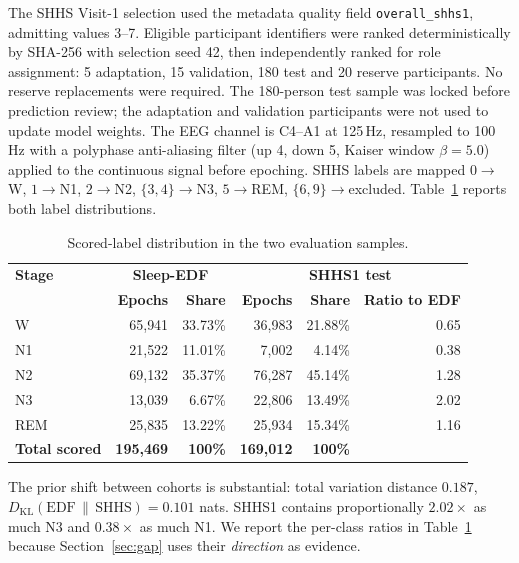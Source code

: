 \documentclass[11pt,a4paper]{article}
\begin{document}
The SHHS Visit-1 selection used the metadata quality field \texttt{overall\_shhs1}, admitting values
3--7. Eligible participant identifiers were ranked deterministically by SHA-256 with selection seed 42,
then independently ranked for role assignment: 5 adaptation, 15 validation, 180 test and 20 reserve
participants. No reserve replacements were required. The 180-person test sample was locked before
prediction review; the adaptation and validation participants were not used to update model weights.
The EEG channel is C4--A1 at 125\,Hz, resampled to 100\,Hz with a polyphase anti-aliasing
filter (up 4, down 5, Kaiser window $\beta = 5.0$) applied to the continuous signal before epoching.
SHHS labels are mapped $0\rightarrow$W, $1\rightarrow$N1, $2\rightarrow$N2, $\{3,4\}\rightarrow$N3,
$5\rightarrow$REM, $\{6,9\}\rightarrow$excluded. Table~\ref{tab:class-distribution} reports both label
distributions.

\begin{table}[H]
\centering
\caption{Scored-label distribution in the two evaluation samples.}
\label{tab:class-distribution}
\small
\begin{tabular}{lrr|rrr}
\toprule
\textbf{Stage} & \multicolumn{2}{c|}{\textbf{Sleep-EDF}} & \multicolumn{3}{c}{\textbf{SHHS1 test}} \\
 & \textbf{Epochs} & \textbf{Share} & \textbf{Epochs} & \textbf{Share} & \textbf{Ratio to EDF} \\
\midrule
W   & 65{,}941 & 33.73\% & 36{,}983 & 21.88\% & 0.65 \\
N1  & 21{,}522 & 11.01\% & 7{,}002  & 4.14\%  & 0.38 \\
N2  & 69{,}132 & 35.37\% & 76{,}287 & 45.14\% & 1.28 \\
N3  & 13{,}039 & 6.67\%  & 22{,}806 & 13.49\% & 2.02 \\
REM & 25{,}835 & 13.22\% & 25{,}934 & 15.34\% & 1.16 \\
\midrule
\textbf{Total scored} & \textbf{195{,}469} & \textbf{100\%} & \textbf{169{,}012} & \textbf{100\%} & \\
\bottomrule
\end{tabular}
\end{table}

The prior shift between cohorts is substantial: total variation distance $0.187$,
$D_{\mathrm{KL}}(\text{EDF} \,\|\, \text{SHHS}) = 0.101$ nats. SHHS1 contains proportionally
$2.02\times$ as much N3 and $0.38\times$ as much N1. We report the per-class ratios in
Table~\ref{tab:class-distribution} because Section~\ref{sec:gap} uses their \emph{direction} as evidence.
\end{document}
